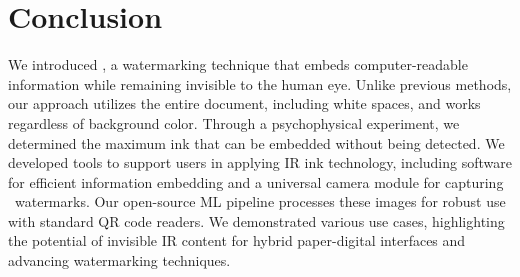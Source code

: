 \section{Conclusion}


We introduced \systemName, a watermarking technique that embeds computer-readable information while remaining invisible to the human eye. Unlike previous methods, our approach utilizes the entire document, including white spaces, and works regardless of background color. Through a psychophysical experiment, we determined the maximum ink that can be embedded without being detected. We developed tools to support users in applying IR ink technology, including software for efficient information embedding and a universal camera module for capturing \systemName~watermarks. Our open-source ML pipeline processes these images for robust use with standard QR code readers. We demonstrated various use cases, highlighting the potential of invisible IR content for hybrid paper-digital interfaces and advancing watermarking techniques.


